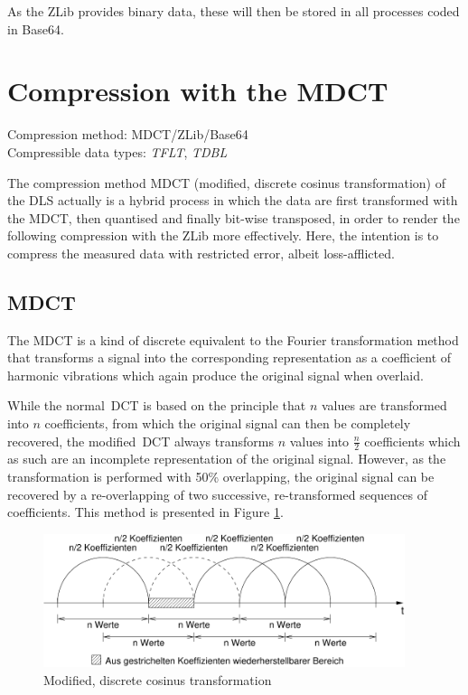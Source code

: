 \documentclass[a4paper,12pt,BCOR6mm,bibtotoc,idxtotoc]{scrbook}
\begin{document}
As the ZLib provides binary data, these will then be stored in all processes coded in Base64.


\section{Compression with the MDCT} \label{sec:comp_mdct} 

Compression method: MDCT/ZLib/Base64\\ Compressible data types: \textit{TFLT}, \textit{TDBL}

The compression method MDCT (\glqq modified, discrete cosinus transformation\grqq) of the DLS actually is a hybrid process in which the data are first transformed with the MDCT, then quantised and finally bit-wise transposed, in order to render the following compression with the ZLib more effectively. Here, the intention is to compress the measured data with restricted error, albeit loss-afflicted.

\subsection{MDCT}

The MDCT is a kind of discrete equivalent to the Fourier transformation method that transforms a signal into the corresponding representation as a coefficient of harmonic vibrations which again produce the original signal when overlaid.

While the \glqq normal\grqq\ DCT is based on the principle that $n$ values are transformed into $n$ coefficients, from which the original signal can then be completely recovered, the \glqq modified\grqq\ DCT always transforms $n$ values into $\frac{n}{2}$ coefficients which as such are an incomplete representation of the original signal. However, as the transformation is performed with 50\% overlapping, the original signal can be recovered by a re-overlapping of two successive, re-transformed sequences of coefficients. This method is presented in Figure \ref{fig:comp_mdct}.

\begin{figure}[htb] \begin{center} \includegraphics[width=300pt]{bilder/mdct} \end{center} \caption{Modified, discrete cosinus transformation} \label{fig:comp_mdct} \end{figure}
\end{document}
